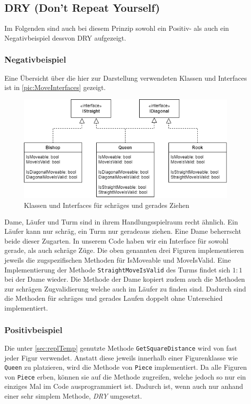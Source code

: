 \documentclass[
10pt, %
a4paper, %
oneside, %
headinclude,footinclude, %
BCOR5mm, %
]{scrartcl}
\begin{document}
\begin{onehalfspace}
\subsection{DRY (Don't Repeat Yourself)}
Im Folgenden sind auch bei diesem Prinzip sowohl ein Positiv- als auch ein Negativbeispiel dessvon DRY aufgezeigt. 

\subsubsection{Negativbeispiel}
Eine Übersicht über die hier zur Darstellung verwendeten Klassen und Interfaces ist in \autoref{pic:MoveInterfaces} gezeigt.

\begin{figure}[h]
	\begin{center}
		\includegraphics[width=11cm]{MoveInterfaces.png}
		\caption{\label{pic:MoveInterfaces}Klassen und Interfaces für schräges und gerades Ziehen}
	\end{center}
\end{figure}

Dame, Läufer und Turm sind in ihrem Handlungsspielraum recht ähnlich. Ein Läufer kann nur schräg, ein Turm nur geradeaus ziehen. Eine Dame beherrscht beide dieser Zugarten. In unserem Code haben wir ein Interface für sowohl gerade, als auch schräge Züge. Die oben genannten drei Figuren implementieren jeweils die zugspezifischen Methoden für IsMoveable und MoveIsValid. 
Eine Implementierung der Methode \texttt{StraightMoveIsValid} des Turms findet sich $1:1$ bei der Dame wieder. Die Methode der Dame kopiert zudem auch die Methoden zur schrägen Zugvalidierung welche auch im Läufer zu finden sind. Dadurch sind die Methoden für schräges und gerades Laufen doppelt ohne Unterschied implementiert.

\subsubsection{Positivbeispiel}
Die unter \autoref{sec:replTemp} genutzte Methode \texttt{GetSquareDistance} wird von fast jeder Figur verwendet. Anstatt diese jeweils innerhalb einer Figurenklasse wie \texttt{Queen} zu platzieren, wird die Methode von \texttt{Piece} implementiert. Da alle Figuren von \texttt{Piece} erben, können sie auf die Methode zugreifen, welche jedoch so nur ein einziges Mal im Code ausprogrammiert ist. Dadurch ist, wenn auch nur anhand einer sehr simplem Methode, \textit{DRY} umgesetzt.
\newpage

\end{onehalfspace}
\end{document}
